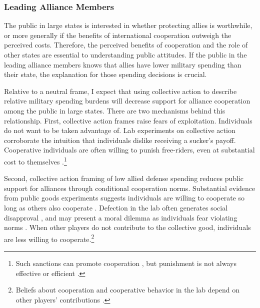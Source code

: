 \documentclass[12pt]{article}
\begin{document}
\subsubsection{Leading Alliance Members}


The public in large states is interested in whether protecting allies is worthwhile, or more generally if the benefits of international cooperation outweigh the perceived costs. 
Therefore, the perceived benefits of cooperation and the role of other states are essential to understanding public attitudes. 
If the public in the leading alliance members knows that allies have lower military spending than their state, the explanation for those spending decisions is crucial.  


Relative to a neutral frame, I expect that using collective action to describe relative military spending burdens will decrease support for alliance cooperation among the public in large states. 
There are two mechanisms behind this relationship.
First, collective action frames raise fears of exploitation. 
Individuals do not want to be taken advantage of. 
Lab experiments on collective action corroborate the intuition that individuals dislike receiving a sucker's payoff. 
Cooperative individuals are often willing to punish free-riders, even at substantial cost to themselves \citep{FehrGatcher2000, Seftonetal2007}.\footnote{Such sanctions can promote cooperation \citep{Guererketal2006}, but punishment is not always effective \citep{Houseretal2008} or efficient \citep{Pageetal2005, Seftonetal2007, Randetal2009}.}


Second, collective action framing of low allied defense spending reduces public support for alliances through conditional cooperation norms. 
Substantial evidence from public goods experiments suggests individuals are willing to cooperate so long as others also cooperate \citep{Chaudhuri2011}.
Defection in the lab often generates social disapproval \citep{GachterFehr1999, Cubittetal2011a}, and may present a moral dilemma as individuals fear violating norms \citep{Nielsenetal2014}. 
When other players do not contribute to the collective good, individuals are less willing to cooperate.\footnote{Beliefs about cooperation and cooperative behavior in the lab depend on other players' contributions \citep{FischbacherGachter2010}.}
\end{document}
